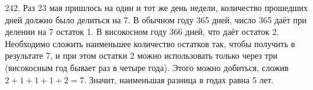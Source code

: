 242. Раз 23 мая пришлось на один и тот же день недели, количество прошедших дней должно было делиться на 7. В обычном году 365 дней, число 365 даёт при делении на 7 остаток 1. В високосном году 366 дней, что даёт остаток 2. Необходимо сложить наименьшее количество остатков так, чтобы получить в результате 7, и при этом остатки 2 можно использовать только через три (високосным год бывает раз в четыре года). Этого можно добиться, сложив $2+1+1+1+2=7.$ Значит, наименьшая разница в годах равна 5 лет.\\
